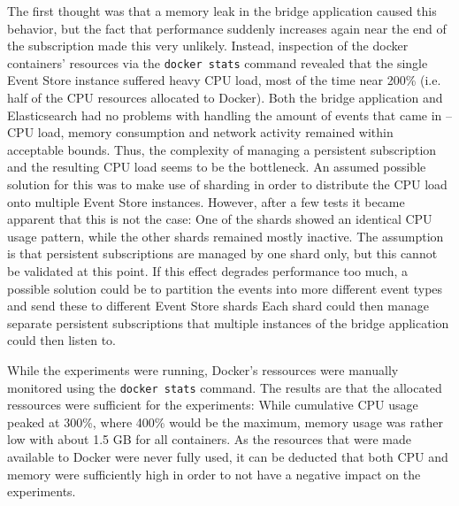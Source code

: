 The first thought was that a memory leak in the bridge application caused this behavior, but the fact that performance suddenly increases again near the end of the subscription made this very unlikely.
Instead, inspection of the docker containers' resources via the \texttt{docker stats} command revealed that the single Event Store instance suffered heavy CPU load, most of the time near 200\% (i.e. half of the CPU resources allocated to Docker).
Both the bridge application and Elasticsearch had no problems with handling the amount of events that came in -- CPU load, memory consumption and network activity remained within acceptable bounds.
Thus, the complexity of managing a persistent subscription and the resulting CPU load seems to be the bottleneck.
An assumed possible solution for this was to make use of sharding in order to distribute the CPU load onto multiple Event Store instances.
However, after a few tests it became apparent that this is not the case: One of the shards showed an identical CPU usage pattern, while the other shards remained mostly inactive.
The assumption is that persistent subscriptions are managed by one shard only, but this cannot be validated at this point.
If this effect degrades performance too much, a possible solution could be to partition the events into more different event types and send these to different Event Store shards
Each shard could then manage separate persistent subscriptions that multiple instances of the bridge application could then listen to.


While the experiments were running, Docker's ressources were manually monitored using the \texttt{docker stats} command.
The results are that the allocated ressources were sufficient for the experiments:
While cumulative CPU usage peaked at 300\%, where 400\% would be the maximum, memory usage was rather low with about 1.5 GB for all containers.
As the resources that were made available to Docker were never fully used, it can be deducted that both CPU and memory were sufficiently high in order to not have a negative impact on the experiments.

